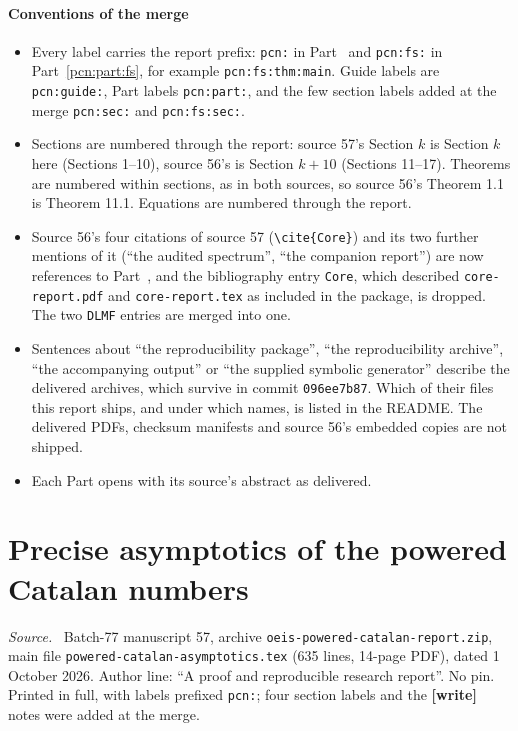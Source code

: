 \documentclass[11pt,letterpaper]{article}
\theoremstyle{remark}\newtheorem{remark}[theorem]{Remark}
\newenvironment{partsource}{\par\medskip\noindent\begin{minipage}{\linewidth}\small\raggedright\textit{Source.}\ }{\end{minipage}\par\medskip}
\begin{document}
\subsection*{Conventions of the merge}
\label{pcn:guide:conventions}
\begin{itemize}
\item Every label carries the report prefix: \texttt{pcn:} in Part~\ref{pcn:part:core} and \texttt{pcn:fs:} in Part~\ref{pcn:part:fs}, for example \texttt{pcn:fs:thm:main}. Guide labels are \texttt{pcn:guide:}, Part labels \texttt{pcn:part:}, and the few section labels added at the merge \texttt{pcn:sec:} and \texttt{pcn:fs:sec:}.
\item Sections are numbered through the report: source 57's Section $k$ is Section $k$ here (Sections 1--10), source 56's is Section $k+10$ (Sections 11--17). Theorems are numbered within sections, as in both sources, so source 56's Theorem 1.1 is Theorem 11.1. Equations are numbered through the report.
\item Source 56's four citations of source 57 (\texttt{\textbackslash cite\{Core\}}) and its two further mentions of it (``the audited spectrum'', ``the companion report'') are now references to Part~\ref{pcn:part:core}, and the bibliography entry \texttt{Core}, which described \texttt{core-report.pdf} and \texttt{core-report.tex} as included in the package, is dropped. The two \texttt{DLMF} entries are merged into one.
\item Sentences about ``the reproducibility package'', ``the reproducibility archive'', ``the accompanying output'' or ``the supplied symbolic generator'' describe the delivered archives, which survive in commit \texttt{096ee7b87}. Which of their files this report ships, and under which names, is listed in the README. The delivered PDFs, checksum manifests and source 56's embedded copies are not shipped.
\item Each Part opens with its source's abstract as delivered.
\end{itemize}

\cleardoublepage
\part{Precise asymptotics of the powered Catalan numbers}\label{pcn:part:core}

\begin{partsource}
Batch-77 manuscript 57, archive \texttt{oeis-powered-catalan-report.zip}, main file \texttt{powered-catalan-asymptotics.tex} (635 lines, 14-page PDF), dated 1 October 2026. Author line: ``A proof and reproducible research report''. No pin. Printed in full, with labels prefixed \texttt{pcn:}; four section labels and the \textbf{[write]} notes were added at the merge.
\end{partsource}
\end{document}
